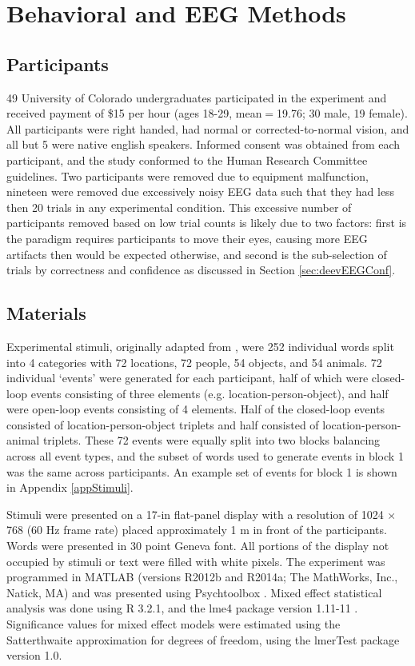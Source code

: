 \documentclass[11pt, titlepage, twoside]{article}
\begin{document}
\section{Behavioral and EEG Methods}\label{sec:behmethods}


\subsection{Participants}
49 University of Colorado undergraduates participated in the experiment and received payment of \$15 per hour (ages 18-29, mean$=$19.76; 30 male, 19 female). All participants were right handed, had normal or corrected-to-normal vision, and all but 5 were native english speakers.  Informed consent was obtained from each participant, and the study conformed to the Human Research Committee guidelines.  Two participants were removed due to equipment malfunction, nineteen were removed due excessively noisy EEG data such that they had less then 20 trials in any experimental condition.  This excessive number of participants removed based on low trial counts is likely due to two factors: first is the paradigm requires participants to move their eyes, causing more EEG artifacts then would be expected otherwise, and second is the sub-selection of trials by correctness and confidence as discussed in Section \ref{sec:deevEEGConf}.  

\subsection{Materials}
Experimental stimuli, originally adapted from \textcite{HornerBisbyBushEtAl15}, were 252 individual words split into 4 categories with 72 locations, 72 people, 54 objects, and 54 animals.  72 individual `events' were generated for each participant, half of which were closed-loop events consisting of three elements (e.g. location-person-object), and half were open-loop events consisting of 4 elements.  Half of the closed-loop events consisted of location-person-object triplets and half consisted of location-person-animal triplets.  These 72 events were equally split into two blocks balancing across all event types, and the subset of words used to generate events in block 1 was the same across participants.  An example set of events for block 1 is shown in Appendix \ref{appStimuli}.  

Stimuli were presented on a 17-in flat-panel display with a resolution of 1024 $\times$ 768 (60 Hz frame rate) placed approximately 1 m in front of the participants. Words were presented in 30 point Geneva font.  All portions of the display not occupied by stimuli or text were filled with white pixels. The experiment was programmed in MATLAB (versions R2012b and R2014a; The MathWorks, Inc., Natick, MA) and was presented using Psychtoolbox \parencite{Brainard97}.  Mixed effect statistical analysis was done using R 3.2.1, and the lme4 package version 1.11-11 \parencite{BatesMachlerBolkerEtAl14}.  Significance values for mixed effect models were estimated using the Satterthwaite approximation for degrees of freedom, using the lmerTest package version 1.0.
\end{document}
